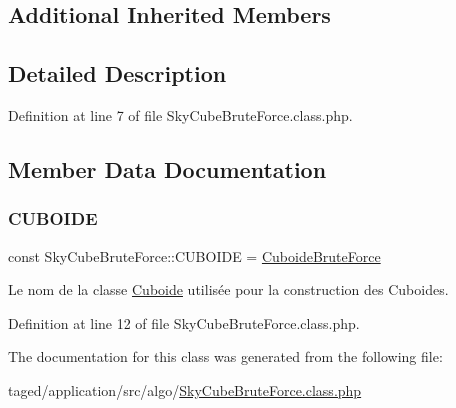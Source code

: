 \subsection*{Additional Inherited Members}


\subsection{Detailed Description}


Definition at line 7 of file Sky\+Cube\+Brute\+Force.\+class.\+php.



\subsection{Member Data Documentation}
\mbox{\label{class_sky_cube_brute_force_aab388dcdfbb6d0151f40f93faec35db2}} 
\subsubsection{\texorpdfstring{C\+U\+B\+O\+I\+DE}{CUBOIDE}}
{\footnotesize\ttfamily const Sky\+Cube\+Brute\+Force\+::\+C\+U\+B\+O\+I\+DE = \textquotesingle{}\hyperlink{class_cuboide_brute_force}{Cuboide\+Brute\+Force}\textquotesingle{}}

Le nom de la classe \hyperlink{class_cuboide}{Cuboide} utilisée pour la construction des Cuboides. 

Definition at line 12 of file Sky\+Cube\+Brute\+Force.\+class.\+php.



The documentation for this class was generated from the following file\+:\begin{DoxyCompactItemize}
\item 
taged/application/src/algo/\hyperlink{_sky_cube_brute_force_8class_8php}{Sky\+Cube\+Brute\+Force.\+class.\+php}\end{DoxyCompactItemize}
